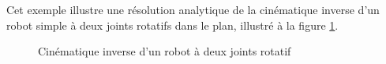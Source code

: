 Cet exemple illustre une résolution analytique de la cinématique inverse d'un robot simple à deux joints rotatifs dans le plan, illustré à la figure \ref{fig:invkin}.

\begin{figure}[htbp]
        \centering
				\hspace{10pt}
        \caption{Cinématique inverse d'un robot à deux joints rotatif }
				\label{fig:invkin}
\end{figure}

